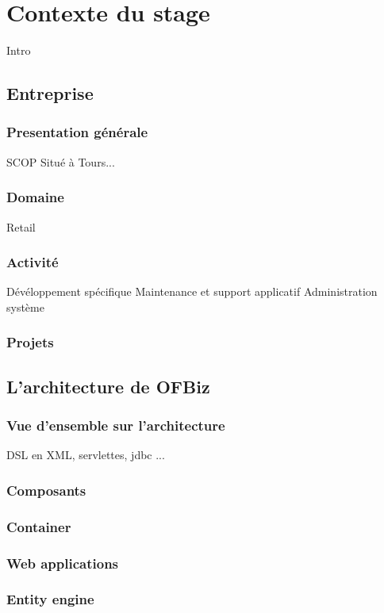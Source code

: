 \chapter{Contexte du stage}

Intro

\section{Entreprise}
\subsection{Presentation générale }
SCOP Situé à Tours...

\subsection{Domaine}
Retail
\subsection{Activité}
Dévéloppement spécifique 
Maintenance et support applicatif
Administration système
\subsection{Projets}

\section{L'architecture de OFBiz}
\subsection{Vue d'ensemble sur l'architecture}
DSL en XML, servlettes, jdbc ...
\subsection{Composants }

\subsection{Container}
\subsection{Web applications}
\subsection{Entity engine}
